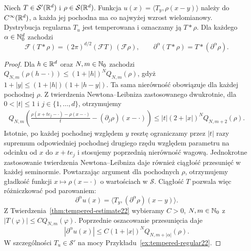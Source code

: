 \begin{twierdzenie}
\label{thm:schwartz-convolution22}
Niech $T\in\mathcal S'(\mathbb R^d)$ i
$\rho\in\mathcal S(\mathbb R^d)$. Funkcja
$u(x)=\langle T_y,\rho(x-y)\rangle$ należy do
$C^\infty(\mathbb R^d)$, a każda jej pochodna ma
co najwyżej wzrost wielomianowy. Dystrybucja
regularna $T_u$ jest temperowana i oznaczamy ją $T*\rho$.
Dla każdego $\alpha\in\mathbb N_0^d$ zachodzi
\[
\mathcal F(T*\rho)=(2\pi)^{d/2}(\mathcal FT)\,(\mathcal F\rho),
\qquad \partial^\alpha(T*\rho)=T*(\partial^\alpha\rho).
\]
\end{twierdzenie}
\begin{proof}
Dla $h\in\mathbb R^d$ oraz $N,m\in\mathbb N_0$ zachodzi
$Q_{N,m}(\rho(h-\cdot))\le(1+|h|)^N Q_{N,m}(\rho)$,
gdyż $1+|y|\le(1+|h|)(1+|h-y|)$.
Ta sama nierówność obowiązuje dla każdej pochodnej
$\rho$. Z twierdzenia Newtona--Leibniza zastosowanego
dwukrotnie, dla $0<|t|\le1$ i $j\in\{1,\ldots,d\}$,
otrzymujemy
\[
\begin{aligned}
 Q_{N,m}\left(
 \frac{\rho(x+te_j-\cdot)-\rho(x-\cdot)}{t}
 -(\partial_j\rho)(x-\cdot)\right)
 \le |t|(2+|x|)^N Q_{N,m+2}(\rho).
\end{aligned}
\]
Istotnie, po każdej pochodnej względem $y$ resztę
ograniczamy przez $|t|$ razy supremum odpowiedniej
pochodnej drugiego rzędu względem parametru na
odcinku od $x$ do $x+te_j$ i stosujemy poprzednią
nierówność wagową. Jednokrotne zastosowanie twierdzenia
Newtona--Leibniza daje również ciągłość przesunięć
w każdej seminormie. Powtarzając argument dla
pochodnych $\rho$, otrzymujemy gładkość funkcji
$x\mapsto\rho(x-\cdot)$ o wartościach w $\mathcal S$.
Ciągłość $T$ pozwala więc różniczkować pod parowaniem:
\[
 \partial^\alpha u(x)=\langle T_y,
 (\partial^\alpha\rho)(x-y)\rangle.
\]
Z Twierdzenia~\ref{thm:tempered-estimate22} wybieramy
$C>0$, $N,m\in\mathbb N_0$ z $|T(\varphi)|\le C Q_{N,m}(\varphi)$.
Poprzednie oszacowanie przesunięcia daje
\[
 |\partial^\alpha u(x)|\le
 C(1+|x|)^N Q_{N,m+|\alpha|}(\rho).
\]
W szczególności $T_u\in\mathcal S'$ na mocy
Przykładu~\ref{ex:tempered-regular22}.


\end{proof}
